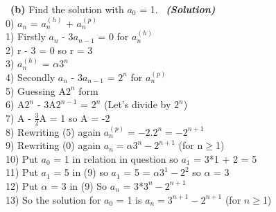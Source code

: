 \documentclass[a4 paper]{article}
\numberwithin{equation}{section}
\newcommand{\subproblem}[1]{~\newline\textbf{(#1)}}
\newcommand{\solution}{~\newline\textbf{\textit{(Solution)}} }
\newcommand{\0}{\mathbf{0}}
\begin{document}
\subproblem{b} Find the solution with $a_0$ = 1.
\solution
\newline\\
0) $a_n$ = $a^{(h)}_n$ + $a^{(p)}_n$
\newline\\
1) Firstly $a_n$ - 3$a_{n-1}$ = 0  for  $a^{(h)}_n$
\newline\\
2) r - 3 = 0 so r = 3
\newline\\
3) $a^{(h)}_n$ = $\alpha3^n$
\newline\\
4) Secondly $a_n$ - 3$a_{n-1}$ = $2^n$  for  $a^{(p)}_n$
\newline\\
5) Guessing A$2^n$ form
\newline\\
6)  A$2^n$ - 3A$2^{n-1}$ = $2^n$  (Let's divide by $2^n$)
\newline\\
7)  A - $\frac{3}{2}$A = 1  so A = -2
\newline\\
8) Rewriting (5) again   $a^{(p)}_n = -2.2^n = - 2^{n+1} $
\newline\\
9) Rewriting (0) again   $a_n = \alpha3^n - 2^{n+1}$  (for n$\geqslant$1)
\newline\\
10) Put $a_0$ = 1 in relation in question so $a_1$ = 3*1 + 2 = 5 
\newline\\
11) Put $a_1$ = 5 in (9) so  $a_1$ = 5 = $\alpha3^1 - 2^{2}$ so $\alpha$ = 3
\newline\\
12) Put $\alpha$ = 3 in (9) So $a_n$ = 3*$3^n - 2^{n+1}$
\newline\\
13) So the solution for $a_0$ = 1 is $a_n = 3^{n+1} - 2^{n+1}$ (for $n\geqslant$1) 
\end{document}
